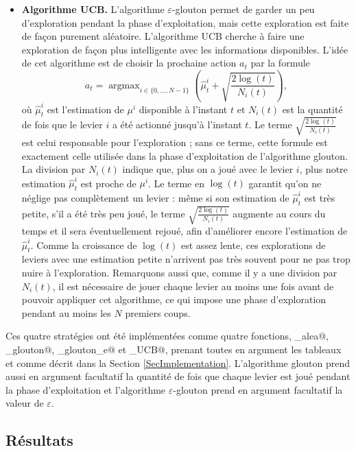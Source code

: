 \documentclass[a4paper,12pt]{article}
\DeclareMathOperator*{\argmax}{argmax}
\begin{document}
\begin{itemize}[label=\textbullet, leftmargin=*]
\item \textbf{Algorithme UCB.} L'algorithme $\varepsilon$-glouton permet de garder un peu d'exploration pendant la phase d'exploitation, mais cette exploration est faite de façon purement aléatoire. L'algorithme UCB cherche à faire une exploration de façon plus intelligente avec les informations disponibles. L'idée de cet algorithme est de choisir la prochaine action $a_t$ par la formule
\[a_t = \argmax_{i \in \{0, \dotsc, N-1\}} \left(\hat\mu_t^i + \sqrt{\frac{2 \log(t)}{N_i(t)}}\right),\]
où $\hat\mu_t^i$ est l'estimation de $\mu^i$ disponible à l'instant $t$ et $N_i(t)$ est la quantité de fois que le levier $i$ a été actionné jusqu'à l'instant $t$. Le terme $\sqrt{\frac{2 \log(t)}{N_i(t)}}$ est celui responsable pour l'exploration ; sans ce terme, cette formule est exactement celle utilisée dans la phase d'exploitation de l'algorithme glouton. La division par $N_i(t)$ indique que, plus on a joué avec le levier $i$, plus notre estimation $\hat\mu_t^i$ est proche de $\mu^i$. Le terme en $\log(t)$ garantit qu'on ne néglige pas complètement un levier : même si son estimation de $\hat\mu_t^i$ est très petite, s'il a été très peu joué, le terme $\sqrt{\frac{2 \log(t)}{N_i(t)}}$ augmente au cours du temps et il sera éventuellement rejoué, afin d'améliorer encore l'estimation de $\hat\mu_t^i$. Comme la croissance de $\log(t)$ est assez lente, ces explorations de leviers avec une estimation petite n'arrivent pas très souvent pour ne pas trop nuire à l'exploration. Remarquons aussi que, comme il y a une division par $N_i(t)$, il est nécessaire de jouer chaque levier au moins une fois avant de pouvoir appliquer cet algorithme, ce qui impose une phase d'exploration pendant au moins les $N$ premiers coups.
\end{itemize}

Ces quatre stratégies ont été implémentées comme quatre fonctions, \verb@algo_alea@, \verb@algo_glouton@, \verb@algo_glouton_e@ et \verb@algo_UCB@, prenant toutes en argument les tableaux \verb@mu@ et \verb@Na@ comme décrit dans la Section \ref{SecImplementation}. L'algorithme glouton prend aussi en argument facultatif la quantité de fois que chaque levier est joué pendant la phase d'exploitation et l'algorithme $\varepsilon$-glouton prend en argument facultatif la valeur de $\varepsilon$.

\subsection{Résultats}
\end{document}
